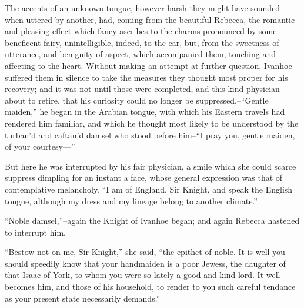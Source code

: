 The accents of an unknown tongue, however harsh they might have sounded
when uttered by another, had, coming from the beautiful Rebecca, the
romantic and pleasing effect which fancy ascribes to the charms
pronounced by some beneficent fairy, unintelligible, indeed, to the ear,
but, from the sweetness of utterance, and benignity of aspect, which
accompanied them, touching and affecting to the heart. Without making an
attempt at further question, Ivanhoe suffered them in silence to take
the measures they thought most proper for his recovery; and it was not
until those were completed, and this kind physician about to retire,
that his curiosity could no longer be suppressed.--``Gentle maiden,'' he
began in the Arabian tongue, with which his Eastern travels had rendered
him familiar, and which he thought most likely to be understood by the
turban'd and caftan'd damsel who stood before him--``I pray you, gentle
maiden, of your courtesy---''

But here he was interrupted by his fair physician, a smile which she
could scarce suppress dimpling for an instant a face, whose general
expression was that of contemplative melancholy. ``I am of England, Sir
Knight, and speak the English tongue, although my dress and my lineage
belong to another climate.''

``Noble damsel,''--again the Knight of Ivanhoe began; and again Rebecca
hastened to interrupt him.

``Bestow not on me, Sir Knight,'' she said, ``the epithet of noble. It
is well you should speedily know that your handmaiden is a poor Jewess,
the daughter of that Isaac of York, to whom you were so lately a good
and kind lord. It well becomes him, and those of his household, to
render to you such careful tendance as your present state necessarily
demands.''

